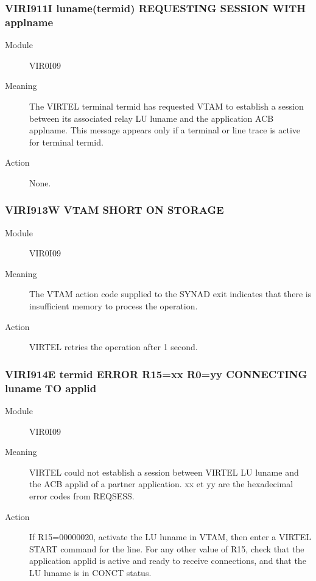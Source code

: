 \documentclass[letterpaper,10pt,english]{sphinxmanual}
\begin{document}
\subsubsection{VIRI911I luname(termid) REQUESTING SESSION WITH applname}
\label{\detokenize{messages:viri911i-luname-termid-requesting-session-with-applname}}\begin{description}
\item[{Module}] \leavevmode
VIR0I09

\item[{Meaning}] \leavevmode
The VIRTEL terminal termid has requested VTAM to establish a session between its associated relay LU luname and the application ACB applname. This message appears only if a terminal or line trace is active for terminal termid.

\item[{Action}] \leavevmode
None.

\end{description}


\subsubsection{VIRI913W VTAM SHORT ON STORAGE}
\label{\detokenize{messages:viri913w-vtam-short-on-storage}}\begin{description}
\item[{Module}] \leavevmode
VIR0I09

\item[{Meaning}] \leavevmode
The VTAM action code supplied to the SYNAD exit indicates that there is insufficient memory to process the operation.

\item[{Action}] \leavevmode
VIRTEL retries the operation after 1 second.

\end{description}


\subsubsection{VIRI914E termid ERROR R15=xx R0=yy CONNECTING luname TO applid}
\label{\detokenize{messages:viri914e-termid-error-r15-xx-r0-yy-connecting-luname-to-applid}}\begin{description}
\item[{Module}] \leavevmode
VIR0I09

\item[{Meaning}] \leavevmode
VIRTEL could not establish a session between VIRTEL LU luname and the ACB applid of a partner application. xx et yy are the hexadecimal error codes from REQSESS.

\item[{Action}] \leavevmode
If R15=00000020, activate the LU luname in VTAM, then enter a VIRTEL START command for the line. For any other value of R15, check that the application applid is active and ready to receive connections, and that the LU luname is in CONCT status.

\end{description}
\end{document}
